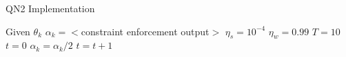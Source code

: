 \documentclass[letter,12pt]{article}
\begin{document}
\begin{algorithm} 
\caption{QN2 Implementation}
\label{qn2_algo}
\begin{algorithmic}[1]
\State Given $\theta_k$
\State $\alpha_k = <$constraint enforcement output$>$
\State $\eta_s = 10^{-4}$
\State $\eta_w = 0.99$
\State $T = 10$
\State $t = 0$
\State $\alpha_k = \alpha_k / 2$
\State $t = t + 1$
\EndWhile
\end{algorithmic}
\end{algorithm}



\end{document}

